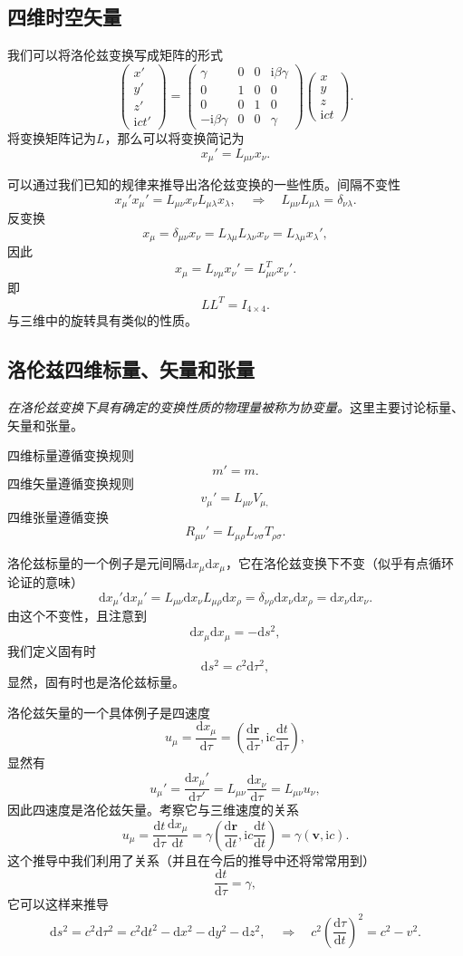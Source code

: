 \documentclass[UTF8]{ctexbook}
\renewcommand{\d}{\mathrm{d}}
\renewcommand{\b}{\boldsymbol}
\renewcommand{\i}{\mathrm{i}}
\numberwithin{equation}{chapter}
\begin{document}
	\subsection{四维时空矢量}
	我们可以将洛伦兹变换写成矩阵的形式
	\[\begin{pmatrix}
		x' \\ y' \\ z' \\ \i ct' 
	\end{pmatrix}=\begin{pmatrix}
	\gamma & 0 & 0 & \i\beta \gamma \\ 0 & 1 & 0 & 0 \\ 0 & 0 & 1 & 0 \\ -\i\beta\gamma & 0 & 0 & \gamma 
	\end{pmatrix}\begin{pmatrix}
	x \\ y \\ z \\ \i c t
	\end{pmatrix}.\]
	将变换矩阵记为$L$，那么可以将变换简记为
	\[x_\mu'=L_{\mu\nu}x_\nu.\]
	
	可以通过我们已知的规律来推导出洛伦兹变换的一些性质。间隔不变性
	\[x_\mu'x_\mu'=L_{\mu\nu}x_\nu L_{\mu\lambda}x_\lambda,\quad \Rightarrow \quad  L_{\mu\nu}L_{\mu\lambda}=\delta_{\nu \lambda}.\]
	反变换
	\[x_\mu=\delta_{\mu\nu}x_{\nu}=L_{\lambda\mu}L_{\lambda\nu}x_\nu=L_{\lambda\mu}x_{\lambda}',\]
	因此
	\[x_{\mu}=L_{\nu\mu}x_\nu'=L^T_{\mu\nu}x_{\nu}'.\]
	即
	\[LL^T=I_{4\times 4}.\]
	与三维中的旋转具有类似的性质。
	
	\subsection{洛伦兹四维标量、矢量和张量}
	\emph{在洛伦兹变换下具有确定的变换性质的物理量被称为协变量。}这里主要讨论标量、矢量和张量。
	
	四维标量遵循变换规则
	\[m'=m.\]
	四维矢量遵循变换规则
	\[v_{\mu}'=L_{\mu\nu}V_{\mu,}\]
	四维张量遵循变换
	\[R_{\mu\nu}'=L_{\mu\rho}L_{\nu\sigma}T_{\rho\sigma}.\]
	
	洛伦兹标量的一个例子是元间隔$\d x_\mu\d x_\mu$，它在洛伦兹变换下不变（似乎有点循环论证的意味）
	\[\d x_\mu'\d x_\mu'=L_{\mu\nu}\d x_\nu L_{\mu \rho}\d x_\rho=\delta_{\nu\rho}\d x_\nu\d x_\rho = \d x_\nu\d x_\nu.\]
	由这个不变性，且注意到
	\[\d x_{\mu}\d x_\mu=-\d s^2,\]
	我们定义固有时
	\[\d s^2=c^2\d \tau^2,\]
	显然，固有时也是洛伦兹标量。
	
	洛伦兹矢量的一个具体例子是四速度
	\[u_\mu=\frac{\d x_\mu}{\d \tau}=\left(\frac{\d \b{r}}{\d \tau},\i c\frac{\d t}{\d \tau}\right), \]
	显然有
	\[u_\mu'=\frac{\d x_\mu'}{\d \tau'}=L_{\mu\nu}\frac{\d x_\nu}{\d \tau}=L_{\mu\nu}u_\nu,\]
	因此四速度是洛伦兹矢量。考察它与三维速度的关系
	\[u_\mu=\frac{\d t}{\d \tau}\frac{\d x_\mu}{\d t}=\gamma\left(\frac{\d \b{r}}{\d t},\i c \frac{\d t}{\d t}\right)=\gamma(\b{v},\i c).\]
	这个推导中我们利用了关系（并且在今后的推导中还将常常用到）
	\[\frac{\d t}{\d \tau}=\gamma,\]
	它可以这样来推导
	\[\d s^2=c^2 \d \tau^2=c^2\d t^2- \d x^2 -\d y^2- \d z^2,\quad \Rightarrow \quad c^2\left(\frac{\d\tau}{\d t}\right)^2=c^2 - v^2.\]
	
\end{document}
